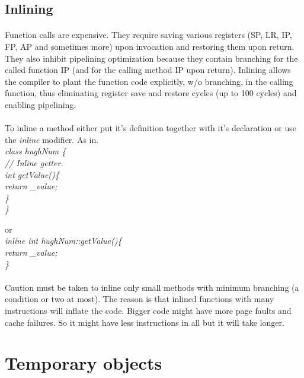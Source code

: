 \documentclass{article}
\begin{document}
 \subsection{Inlining}
 \paragraph{}
 Function calls are expensive. They require saving various registers (SP, LR, IP, FP, AP and sometimes more) upon invocation and restoring them upon return.
   They also inhibit pipelining optimization because they contain branching for the called function IP (and for the calling method IP upon return).
 Inlining allows the compiler to plant the function code explicitly, w/o branching, in the calling function, thus eliminating register save and restore  cycles (up to 100 cycles) and enabling pipelining.
 
 \paragraph{}
 To inline a method either put it's definition together with it's declaration or use the \emph{inline} modifier.
 As in.\\
 \emph{
 class hughNum \{ \\
% 
 // Inline getter.\\
  int getValue()\{ \\
   return \_value; \\
  \} \\
 \}
 }

 or \\
 \emph{
 inline int hughNum::getValue()\{ \\
   return  \_value; \\
  \} \\
 }

 \paragraph{}
 Caution must be taken to inline only small methods with minimum branching (a condition or two at most).  The reason is that inlined functions with many instructions will inflate the code.  Bigger code might have more page faults and cache failures. So it might have less instructions in all but it will take longer.

\section {Temporary objects}
\end{document}
